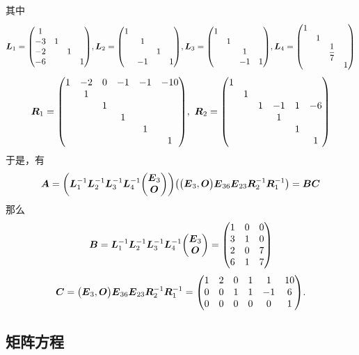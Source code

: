\begin{solution}
\begin{enumerate}[label=(\arabic{*})]
              其中 $$\vb*{L}_1=\mqty(1\\-3&1\\-2&&1\\-6&&&1),\vb*{L}_2=\mqty(1\\&1\\&&1\\&-1&&1),\vb*{L}_3=\mqty(1\\&1\\&&1\\&&-1&1),\vb*{L}_4=\mqty(1\\&1\\&&\dfrac{1}{7}\\&&&1)$$
              $$\vb*{R}_1=\mqty(1&-2&0&-1&-1&-10\\&1\\&&1\\&&&1\\&&&&1\\&&&&&1),~\vb*{R}_2=\mqty(1\\&1\\&&1&-1&1&-6\\&&&1\\&&&&1\\&&&&&1)$$
              于是，有 $$\vb*{A}=\qty(\vb*{L}_1^{-1}\vb*{L}_2^{-1}\vb*{L}_3^{-1}\vb*{L}_4^{-1}\mqty(\vb*{E}_3\\\vb*{O}))\qty(\mqty(\vb*{E}_3,\vb*{O})\vb*{E}_{36}\vb*{E}_{23}\vb*{R}_2^{-1}\vb*{R}_1^{-1})=\vb*{BC}$$
              那么 $$\vb*{B}=\vb*{L}_1^{-1}\vb*{L}_2^{-1}\vb*{L}_3^{-1}\vb*{L}_4^{-1}\mqty(\vb*{E}_3\\\vb*{O})=\mqty(1&0&0\\3&1&0\\2&0&7\\6&1&7)$$
              $$\vb*{C}=\mqty(\vb*{E}_3,\vb*{O})\vb*{E}_{36}\vb*{E}_{23}\vb*{R}_2^{-1}\vb*{R}_1^{-1}=\mqty(1&2&0&1&1&10\\0&0&1&1&-1&6\\0&0&0&0&0&1).$$
    \end{enumerate}
\end{solution}

\subsection{矩阵方程}

